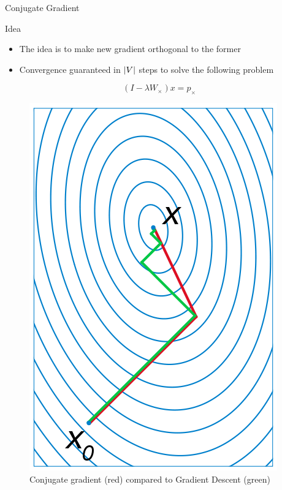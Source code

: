 \documentclass[compress]{beamer}
\DeclarePairedDelimiter{\abs}{\lvert}{\rvert}
\begin{document}
\begin{frame}{Conjugate Gradient}
	\begin{block}{Idea}
		\begin{itemize}
			\item The idea is to make new gradient orthogonal to the former
			\item Convergence guaranteed in $\abs{V}$ steps to solve the following problem
		\end{itemize}
		\begin{equation}
		(I-\lambda W_{\times})x=p_{\times}
		\end{equation}
	\end{block}
	\begin{figure}[!htb]
		\centering
		\includegraphics[height=0.3\textheight]{data/sota/conj_grad.png}
		\caption{Conjugate gradient (red) compared to Gradient Descent (green)}
		\label{fig:conj_grad}
	\end{figure} 
\end{frame}
\end{document}
